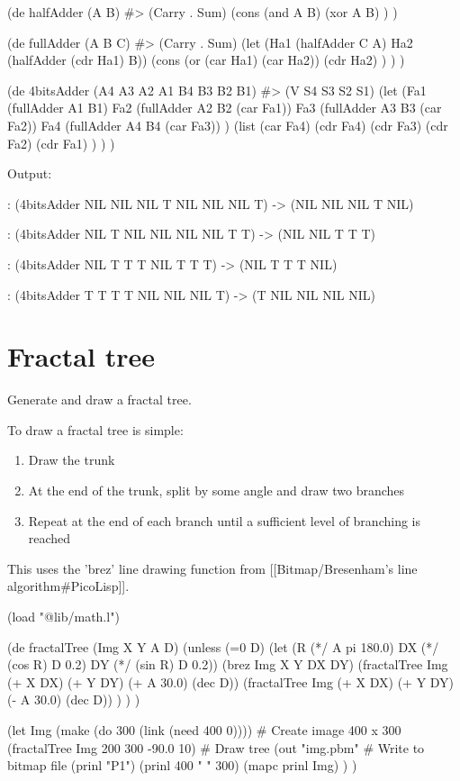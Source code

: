 \begin{wideverbatim}

(de halfAdder (A B)  #> (Carry . Sum)
   (cons
      (and A B)
      (xor A B) ) )

(de fullAdder (A B C)  #> (Carry . Sum)
   (let (Ha1 (halfAdder C A)  Ha2 (halfAdder (cdr Ha1) B))
      (cons
         (or (car Ha1) (car Ha2))
         (cdr Ha2) ) ) )

(de 4bitsAdder (A4 A3 A2 A1  B4 B3 B2 B1)  #> (V S4 S3 S2 S1)
   (let
      (Fa1 (fullAdder A1 B1)
         Fa2 (fullAdder A2 B2 (car Fa1))
         Fa3 (fullAdder A3 B3 (car Fa2))
         Fa4 (fullAdder A4 B4 (car Fa3)) )
      (list
         (car Fa4)
         (cdr Fa4)
         (cdr Fa3)
         (cdr Fa2)
         (cdr Fa1) ) ) )

Output:

: (4bitsAdder NIL NIL NIL T  NIL NIL NIL T)
-> (NIL NIL NIL T NIL)

: (4bitsAdder NIL T NIL NIL  NIL NIL T T)
-> (NIL NIL T T T)

: (4bitsAdder NIL T T T  NIL T T T)
-> (NIL T T T NIL)

: (4bitsAdder T T T T  NIL NIL NIL T)
-> (T NIL NIL NIL NIL)

\end{wideverbatim}

\pagebreak{}
\section*{Fractal tree}

Generate and draw a fractal tree.

To draw a fractal tree is simple:

\begin{enumerate}
\item
  Draw the trunk
\item
  At the end of the trunk, split by some angle and draw two branches
\item
  Repeat at the end of each branch until a sufficient level of branching
  is reached
\end{enumerate}

\begin{wideverbatim}

This uses the 'brez' line drawing function from
[[Bitmap/Bresenham's line algorithm#PicoLisp]].

(load "@lib/math.l")

(de fractalTree (Img X Y A D)
   (unless (=0 D)
      (let (R (*/ A pi 180.0)  DX (*/ (cos R) D 0.2)  DY (*/ (sin R) D 0.2))
         (brez Img X Y DX DY)
         (fractalTree Img (+ X DX) (+ Y DY) (+ A 30.0) (dec D))
         (fractalTree Img (+ X DX) (+ Y DY) (- A 30.0) (dec D)) ) ) )

(let Img (make (do 300 (link (need 400 0))))       # Create image 400 x 300
   (fractalTree Img 200 300 -90.0 10)              # Draw tree
   (out "img.pbm"                                  # Write to bitmap file
      (prinl "P1")
      (prinl 400 " " 300)
      (mapc prinl Img) ) )

\end{wideverbatim}

